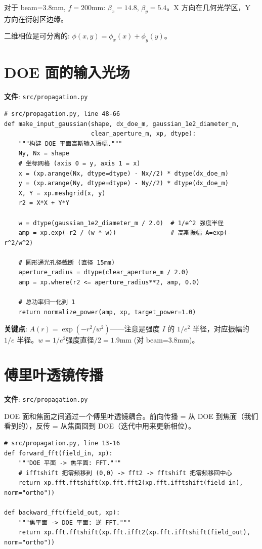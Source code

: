 \documentclass[11pt,a4paper]{ctexart}
\begin{document}
对于 beam=3.8mm, $f=200\text{mm}$: $\beta_x=14.8$, $\beta_y=5.4$。X 方向在几何光学区，Y 方向在衍射区边缘。

二维相位是可分离的: $\phi(x,y) = \phi_x(x) + \phi_y(y)$。

\section{DOE 面的输入光场}

\textbf{文件}: \texttt{src/propagation.py}

\begin{lstlisting}
# src/propagation.py, line 48-66
def make_input_gaussian(shape, dx_doe_m, gaussian_1e2_diameter_m,
                        clear_aperture_m, xp, dtype):
    """构建 DOE 平面高斯输入振幅."""
    Ny, Nx = shape
    # 坐标网格 (axis 0 = y, axis 1 = x)
    x = (xp.arange(Nx, dtype=dtype) - Nx//2) * dtype(dx_doe_m)
    y = (xp.arange(Ny, dtype=dtype) - Ny//2) * dtype(dx_doe_m)
    X, Y = xp.meshgrid(x, y)
    r2 = X*X + Y*Y

    w = dtype(gaussian_1e2_diameter_m / 2.0)  # 1/e^2 强度半径
    amp = xp.exp(-r2 / (w * w))               # 高斯振幅 A=exp(-r^2/w^2)

    # 圆形通光孔径截断 (直径 15mm)
    aperture_radius = dtype(clear_aperture_m / 2.0)
    amp = xp.where(r2 <= aperture_radius**2, amp, 0.0)

    # 总功率归一化到 1
    return normalize_power(amp, xp, target_power=1.0)
\end{lstlisting}

\textbf{关键点}: $A(r) = \exp(-r^2/w^2)$——注意是强度 $I$ 的 $1/e^2$ 半径，对应振幅的 $1/e$ 半径。$w = 1/e^2\text{强度直径} / 2 = 1.9\text{mm}$ (对 beam=3.8mm)。

\section{傅里叶透镜传播}

\textbf{文件}: \texttt{src/propagation.py}

DOE 面和焦面之间通过一个傅里叶透镜耦合。前向传播 = 从 DOE 到焦面（我们看到的），反传 = 从焦面回到 DOE（迭代中用来更新相位）。

\begin{lstlisting}
# src/propagation.py, line 13-16
def forward_fft(field_in, xp):
    """DOE 平面 -> 焦平面: FFT."""
    # ifftshift 把零频移到 (0,0) -> fft2 -> fftshift 把零频移回中心
    return xp.fft.fftshift(xp.fft.fft2(xp.fft.ifftshift(field_in), norm="ortho"))

def backward_fft(field_out, xp):
    """焦平面 -> DOE 平面: 逆 FFT."""
    return xp.fft.fftshift(xp.fft.ifft2(xp.fft.ifftshift(field_out), norm="ortho"))
\end{lstlisting}
\end{document}
